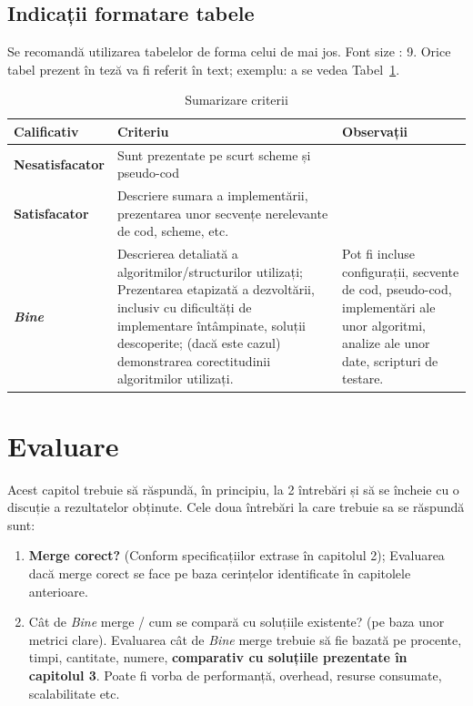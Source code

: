 \documentclass[12pt,a4paper]{report}
\begin{document}
\section{Indicații formatare tabele}
Se recomandă utilizarea tabelelor de forma celui de mai jos.  Font size :  9. 
Orice tabel prezent în teză va fi referit în text; exemplu: a se vedea Tabel~\ref{tab:criterii}.

\begin{table}[th]\small\linespread{1}
\caption{Sumarizare criterii}
\label{tab:criterii}
\begin{tabular}{l >{\raggedright\arraybackslash}p{8cm} >{\raggedright\arraybackslash}p{4cm}}
\textbf{Calificativ} & \textbf{Criteriu} & \textbf{Observații} \\\hline
\textbf{Nesatisfacator} & Sunt prezentate pe scurt scheme și pseudo-cod & \\\hline
\textbf{Satisfacator} &Descriere sumara a implementării, prezentarea unor secvențe nerelevante de cod, scheme, etc.& \\
\hline
\textbf{\textit{Bine}} &Descrierea detaliată a algoritmilor/structurilor utilizați; Prezentarea etapizată a dezvoltării, inclusiv cu dificultăți de implementare întâmpinate, soluții descoperite; (dacă este cazul) demonstrarea corectitudinii algoritmilor utilizați. & Pot fi incluse configurații, secvente de cod, pseudo-cod, implementări ale unor algoritmi, analize ale unor date, scripturi de testare. \\
\hline
\end{tabular}
\end{table}


\chapter{Evaluare}
Acest capitol trebuie să răspundă, în principiu, la 2 întrebări și să se încheie cu o discuție a rezultatelor obținute. Cele doua întrebări la care trebuie sa se răspundă sunt:
\begin{enumerate}
	\item  \textbf{Merge corect?} (Conform specificațiilor extrase în capitolul 2); 
Evaluarea dacă merge corect se face pe baza cerințelor identificate în capitolele anterioare. 

	\item Cât de \textit{Bine} merge / cum se compară cu soluțiile existente? (pe baza unor metrici clare). 
Evaluarea cât de \textit{Bine} merge trebuie să fie bazată pe procente, timpi, cantitate, numere, \textbf{comparativ cu soluțiile prezentate în capitolul 3}. Poate fi vorba de performanță, overhead, resurse consumate, scalabilitate etc. 
\end{enumerate}
\end{document}
